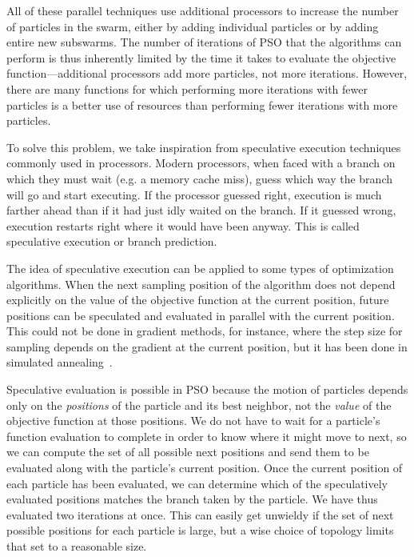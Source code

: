 \documentclass[letterpaper]{sig-alt-release2}
\begin{document}
All of these parallel techniques use additional processors to increase the
number of particles in the swarm, either by adding individual particles or by
adding entire new subswarms.  The number of iterations of PSO that the
algorithms can perform is thus inherently limited by the time it takes to
evaluate the objective function---additional processors add more particles, not
more iterations.  However, there are many functions for which performing more
iterations with fewer particles is a better use of resources than performing
fewer iterations with more particles.  

To solve this problem, we take inspiration from speculative execution
techniques commonly used in processors.  Modern processors, when faced with a
branch on which they must wait (e.g. a memory cache miss), guess which way the
branch will go and start executing.  If the processor guessed right, execution
is much farther ahead than if it had just idly waited on the branch.  If it
guessed wrong, execution restarts right where it would have been anyway.  This
is called speculative execution or branch prediction.

The idea of speculative execution can be applied to some types of optimization
algorithms.  When the next sampling position of the algorithm does not depend
explicitly on the value of the objective function at the current position,
future positions can be speculated and evaluated in parallel with the current
position.  This could not be done in gradient methods, for instance, where the
step size for sampling depends on the gradient at the current position, but it
has been done in simulated annealing~\cite{witte-tpds91}.

Speculative evaluation is possible in PSO because the motion of particles
depends only on the \emph{positions} of the particle and its best neighbor, not
the \emph{value} of the objective function at those positions.  We do not have
to wait for a particle's function evaluation to complete in order to know where
it might move to next, so we can compute the set of all possible next positions
and send them to be evaluated along with the particle's current position.  Once
the current position of each particle has been evaluated, we can determine
which of the speculatively evaluated positions matches the branch taken by the
particle.  We have thus evaluated two iterations at once.  This can easily get
unwieldy if the set of next possible positions for each particle is large, but
a wise choice of topology limits that set to a reasonable size.
\end{document}
